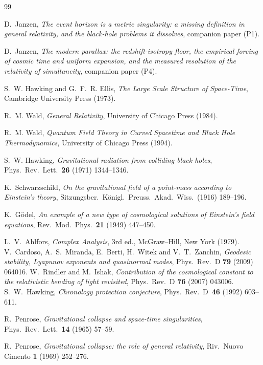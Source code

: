 \documentclass[11pt,a4paper]{article}
\theoremstyle{plain}
\theoremstyle{definition}
\theoremstyle{remark}
\begin{document}
\begin{thebibliography}{99}

D.~Janzen,
\emph{The event horizon is a metric singularity: a missing definition in general relativity, and the black-hole problems it dissolves}, companion paper (P1).

D.~Janzen,
\emph{The modern parallax: the redshift-isotropy floor, the empirical forcing of cosmic time and uniform expansion, and the measured resolution of the relativity of simultaneity}, companion paper (P4).

S.~W. Hawking and G.~F.~R. Ellis,
\emph{The Large Scale Structure of Space-Time},
Cambridge University Press (1973).

R.~M. Wald,
\emph{General Relativity},
University of Chicago Press (1984).

R.~M. Wald,
\emph{Quantum Field Theory in Curved Spacetime and Black Hole Thermodynamics},
University of Chicago Press (1994).

S.~W. Hawking,
\emph{Gravitational radiation from colliding black holes},
Phys.~Rev.~Lett.~\textbf{26} (1971) 1344--1346.

K.~Schwarzschild,
\emph{On the gravitational field of a point-mass according to Einstein's theory},
Sitzungsber.~K\"onigl.~Preuss.~Akad.~Wiss.~(1916) 189--196.

K.~G\"odel,
\emph{An example of a new type of cosmological solutions of Einstein's field equations},
Rev.~Mod.~Phys.~\textbf{21} (1949) 447--450.

 L.~V.~Ahlfors, \emph{Complex Analysis}, 3rd ed., McGraw--Hill, New York (1979).
 V.~Cardoso, A.~S.~Miranda, E.~Berti, H.~Witek and V.~T.~Zanchin, \emph{Geodesic stability, Lyapunov exponents and quasinormal modes}, Phys.\ Rev.\ D \textbf{79} (2009) 064016.
 W.~Rindler and M.~Ishak, \emph{Contribution of the cosmological constant to the relativistic bending of light revisited}, Phys.\ Rev.\ D \textbf{76} (2007) 043006.
S.~W.~Hawking,
\emph{Chronology protection conjecture},
Phys.~Rev.~D~\textbf{46} (1992) 603--611.

R.~Penrose,
\emph{Gravitational collapse and space-time singularities},
Phys.~Rev.~Lett.~\textbf{14} (1965) 57--59.

R.~Penrose,
\emph{Gravitational collapse: the role of general relativity},
Riv.~Nuovo Cimento \textbf{1} (1969) 252--276.


\end{thebibliography}
\end{document}
